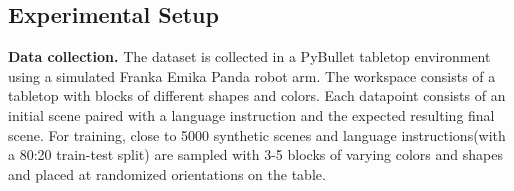 \begin{table}[ht]
    \large
    \centering
    \caption{Comparison b/w Proposed Model and CLIPort}
    \label{tab:cliport}
\end{table} 





\subsection{Experimental Setup}
\textbf{Data collection. } 
The dataset is collected in a PyBullet tabletop environment using a 
simulated Franka Emika Panda robot arm. The workspace consists of a tabletop with blocks of different shapes and colors.
%
Each datapoint consists of an initial scene paired with a language instruction and the expected resulting final scene. 
For training, close to 5000 synthetic scenes and language instructions(with a 80:20 train-test split) are sampled with 3-5 blocks of varying colors and shapes and placed at randomized orientations on the table. 
%
%

